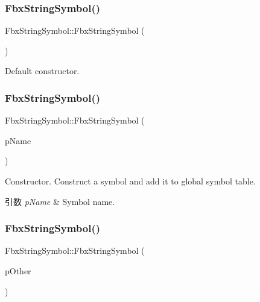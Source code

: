 \subsubsection{\texorpdfstring{Fbx\+String\+Symbol()}{FbxStringSymbol()}\hspace{0.1cm}{\footnotesize\ttfamily [1/3]}}
{\footnotesize\ttfamily Fbx\+String\+Symbol\+::\+Fbx\+String\+Symbol (\begin{DoxyParamCaption}{ }\end{DoxyParamCaption})}



Default constructor. 

\mbox{\label{class_fbx_string_symbol_a245670546cbcfdf41514964b1a6bef90}} 
\subsubsection{\texorpdfstring{Fbx\+String\+Symbol()}{FbxStringSymbol()}\hspace{0.1cm}{\footnotesize\ttfamily [2/3]}}
{\footnotesize\ttfamily Fbx\+String\+Symbol\+::\+Fbx\+String\+Symbol (\begin{DoxyParamCaption}\item[{const char $\ast$}]{p\+Name }\end{DoxyParamCaption})}

Constructor. Construct a symbol and add it to global symbol table. 
\begin{DoxyParams}{引数}
{\em p\+Name} & Symbol name. \\
\hline
\end{DoxyParams}
\mbox{\label{class_fbx_string_symbol_a586aec49bc085596bfa5b809a9948c3c}} 
\subsubsection{\texorpdfstring{Fbx\+String\+Symbol()}{FbxStringSymbol()}\hspace{0.1cm}{\footnotesize\ttfamily [3/3]}}
{\footnotesize\ttfamily Fbx\+String\+Symbol\+::\+Fbx\+String\+Symbol (\begin{DoxyParamCaption}\item[{const \hyperlink{class_fbx_string_symbol}{Fbx\+String\+Symbol} \&}]{p\+Other }\end{DoxyParamCaption})}



